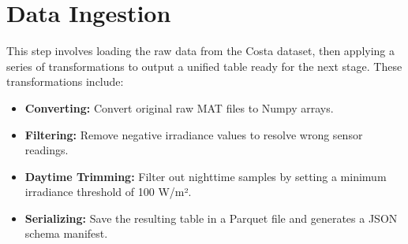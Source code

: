\section{Data Ingestion}
This step involves loading the raw data from the Costa dataset, then applying a series of transformations to output a unified table ready for the next stage.
These transformations include:
\begin{itemize}
    \item \textbf{Converting:} Convert original raw MAT files to Numpy arrays.
    \item \textbf{Filtering:} Remove negative irradiance values to resolve wrong sensor readings.
    \item \textbf{Daytime Trimming:} Filter out nighttime samples by setting a minimum irradiance threshold of 100 W/m².
    \item \textbf{Serializing:} Save the resulting table in a Parquet file and generates a JSON schema manifest.
\end{itemize}




